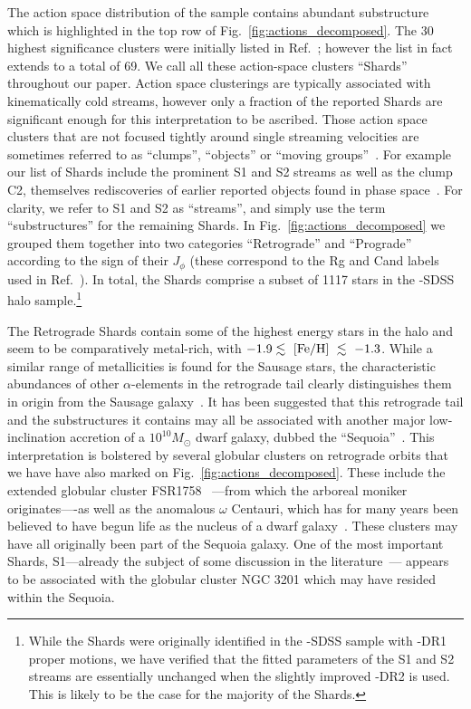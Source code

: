 \documentclass[prd,10pt,twocolumn,showpacs,nofootinbib,aps,superscriptaddress,preprintnumbers]{revtex4-1}
\newcommand{\Gaia}{\!{\it Gaia}\xspace}
\begin{document}
 The action space distribution of the sample contains abundant substructure which is highlighted in the top row of Fig.~\ref{fig:actions_decomposed}. The 30 highest significance clusters
 were initially listed in Ref.~\cite{Myeong:Preprint}; however the
 list in fact extends to a total of 69. We call all these action-space clusters
 ``Shards'' throughout our paper. Action space clusterings are typically associated with kinematically cold streams, however only a fraction of the reported Shards are significant enough for this interpretation to be ascribed. Those action space clusters that are not focused tightly around single streaming velocities are sometimes referred to as ``clumps'', ``objects'' or ``moving groups''~\cite{Myeong:2017skt}. For example our list of Shards include the prominent S1 and S2 streams as well as the clump C2, themselves rediscoveries of earlier reported objects found
 in phase space~\cite{Myeong:2017,Myeong:2017skt}. For clarity, we refer to S1 and S2 as ``streams'', and simply use the term ``substructures'' for the remaining Shards. In Fig.~\ref{fig:actions_decomposed} we grouped them together into two
 categories ``Retrograde'' and ``Prograde'' according to the sign of their
 $J_\phi$ (these correspond to the Rg and Cand labels used in
 Ref.~\cite{Myeong:2017skt}). In total, the Shards comprise a subset of
 1117 stars in the \Gaia-SDSS halo sample.\footnote{While the Shards were originally identified in the \Gaia-SDSS sample with \Gaia-DR1 proper motions, we have verified that the fitted parameters of the S1 and S2 streams are essentially unchanged when the slightly improved \Gaia-DR2 is used. This is likely to be the case for the majority of the Shards.}

 The Retrograde Shards contain some of the highest energy stars in the
 halo and seem to be comparatively metal-rich, with $-1.9\lesssim~[{\rm
     Fe/H}]~\lesssim~-1.3$.  While a similar range of 
 metallicities is found for the Sausage stars, the characteristic abundances of
 other $\alpha$-elements in the retrograde tail clearly distinguishes
 them in origin from the Sausage
 galaxy~\cite{Stephens:2002,Venn:2004,Matsuno:2019}. It has been
 suggested that this retrograde tail and the substructures it contains
 may all be associated with another major low-inclination accretion of
 a $10^{10}M_\odot$ dwarf galaxy, dubbed the
 ``Sequoia''~\cite{Myeong:2019a}. This interpretation is bolstered by
 several globular clusters on retrograde orbits that we have have also
 marked on Fig.~\ref{fig:actions_decomposed}. These include the
 extended globular cluster FSR1758~\cite{Barba:2019,Simpson:2019}
 ---from which the arboreal moniker originates----as well as the anomalous
 $\omega$ Centauri, which has for many years been believed to have begun life as the
 nucleus of a dwarf galaxy~\cite{Bekki:2003qw}. These clusters may have
 all originally been part of the Sequoia galaxy. One of the most
 important Shards, S1---already the subject of some discussion in the
 literature~\cite{OHare:2018trr,Knirck:2018knd,Buckley:2019skk}---
 appears to be associated with the globular cluster NGC 3201 which
 may have resided within the Sequoia.
\end{document}
